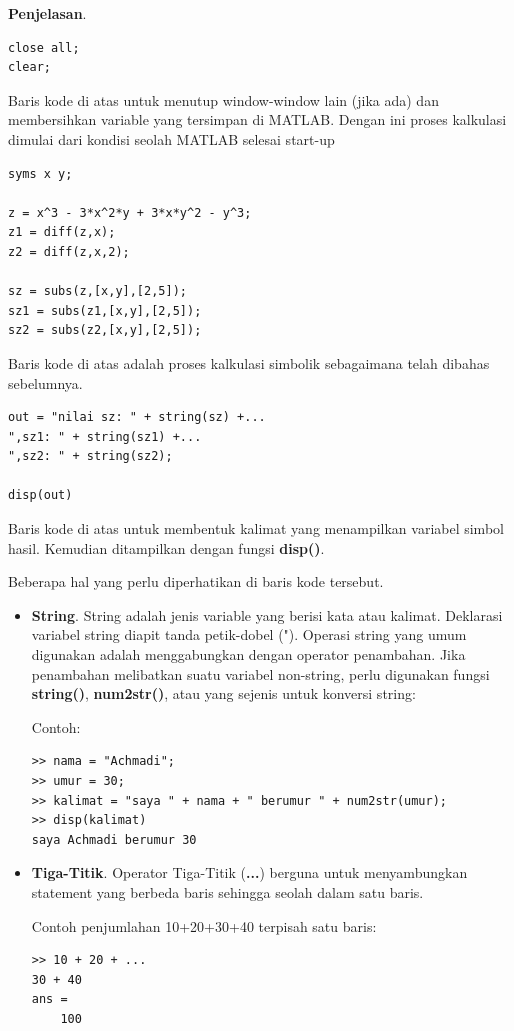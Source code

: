 \documentclass[12pt]{book}
\begin{document}
	\textbf{Penjelasan}.
	\begin{verbatim}
close all;
clear;
	\end{verbatim}
	
	Baris kode di atas untuk menutup window-window lain (jika ada) dan membersihkan variable yang tersimpan di MATLAB.
	Dengan ini proses kalkulasi dimulai dari kondisi seolah MATLAB selesai start-up	
	
	\begin{verbatim}
syms x y;

z = x^3 - 3*x^2*y + 3*x*y^2 - y^3;
z1 = diff(z,x);
z2 = diff(z,x,2);

sz = subs(z,[x,y],[2,5]);
sz1 = subs(z1,[x,y],[2,5]);
sz2 = subs(z2,[x,y],[2,5]);
	\end{verbatim}

	Baris kode di atas adalah proses kalkulasi simbolik sebagaimana telah dibahas sebelumnya.
	
	\begin{verbatim}
out = "nilai sz: " + string(sz) +...
",sz1: " + string(sz1) +...
",sz2: " + string(sz2);

disp(out)
	\end{verbatim}

	Baris kode di atas untuk membentuk kalimat yang menampilkan variabel simbol hasil.
	Kemudian ditampilkan dengan fungsi \textbf{disp()}.
	
	Beberapa hal yang perlu diperhatikan di baris kode tersebut.
	\begin{itemize}
		\item \textbf{String}. String adalah jenis variable yang berisi kata atau kalimat.
		Deklarasi variabel string diapit tanda petik-dobel (").
		Operasi string yang umum digunakan adalah menggabungkan dengan operator penambahan.
		Jika penambahan melibatkan suatu variabel non-string, perlu digunakan fungsi \textbf{string()}, \textbf{num2str()},
		atau yang sejenis untuk konversi string:
		
		Contoh: 
		\begin{verbatim}
>> nama = "Achmadi";
>> umur = 30;
>> kalimat = "saya " + nama + " berumur " + num2str(umur);
>> disp(kalimat)
saya Achmadi berumur 30
		\end{verbatim}
	
		\item \textbf{Tiga-Titik}. Operator Tiga-Titik (\textbf{...}) berguna untuk menyambungkan statement yang berbeda baris
		sehingga seolah dalam satu baris.
		
		Contoh penjumlahan 10+20+30+40 terpisah satu baris:
		\begin{verbatim}
>> 10 + 20 + ...
30 + 40
ans =
    100
    	\end{verbatim}
	\end{itemize}
	
\end{document}
